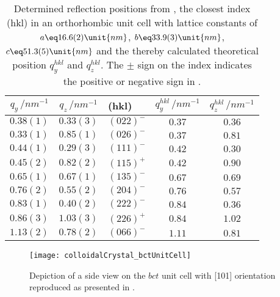 \documentclass[\main/dresen_thesis.tex]{subfiles}
\begin{document}
  \begin{table}[!htbp]
    \centering
    \caption{\label{tab:colloidalCrystals:gisaxs:reflections}Determined reflection positions from , the closest index (hkl) in an orthorhombic unit cell with lattice constants of $a \eq 16.6(2) \unit{nm}$, $b \eq 33.9(3) \unit{nm}$, $c \eq 51.3(5) \unit{nm}$ and the thereby calculated theoretical position $q^{hkl}_y$ and $q^{hkl}_z$. The $\pm$ sign on the index indicates the positive or negative sign in .}
    \begin{tabular}{ c | c | l | c | c}
      $q_y\,/ \unit{nm^{-1}}$ & $q_z\, / \unit{nm^{-1}}$ & (hkl) & $q^{hkl}_y\,/ \unit{nm^{-1}}$ & $q^{hkl}_z\,/ \unit{nm^{-1}}$\\
      \hline
      $0.38(1)$ & $0.33(3)$ & $(022)^{-}$ & $0.37$ & $0.36$\\
      $0.33(1)$ & $0.85(1)$ & $(026)^{-}$ & $0.37$ & $0.81$\\
      $0.44(1)$ & $0.29(3)$ & $(111)^{-}$ & $0.42$ & $0.30$\\
      $0.45(2)$ & $0.82(2)$ & $(115)^{+}$ & $0.42$ & $0.90$\\
      $0.65(1)$ & $0.67(1)$ & $(135)^{-}$ & $0.67$ & $0.69$\\
      $0.76(2)$ & $0.55(2)$ & $(204)^{-}$ & $0.76$ & $0.57$\\
      $0.83(1)$ & $0.40(2)$ & $(222)^{-}$ & $0.84$ & $0.36$\\
      $0.86(3)$ & $1.03(3)$ & $(226)^{+}$ & $0.84$ & $1.02$\\
      $1.13(2)$ & $0.78(2)$ & $(066)^{-}$ & $1.11$ & $0.81$\\
      \hline
    \end{tabular}
  \end{table}

  \begin{figure}[tb]
    \centering
    \texttt{[image: colloidalCrystal\_bctUnitCell]}
    \caption{\label{fig:colloidalCrystals:layers:gisaxsBCTUCDepiction}Depiction of a side view on the $bct$ unit cell with [101] orientation reproduced as presented in \cite{Wetterskog_2016_Tunin}.}
  \end{figure}
  
\end{document}
